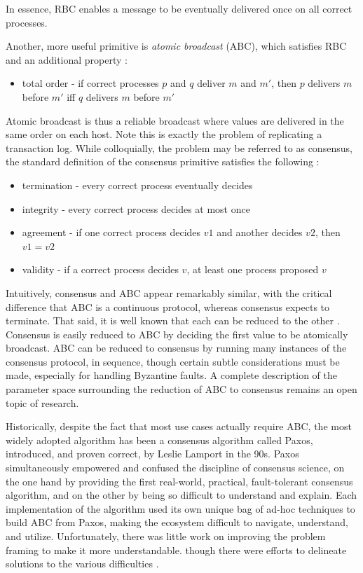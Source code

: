 In essence, RBC enables a message to be eventually delivered once on all correct processes.

Another, more useful primitive is \emph{atomic broadcast} (ABC), 
which satisfies RBC and an additional property \cite{chandra1996unreliable}:

\begin{itemize}
\item total order - if correct processes $p$ and $q$ deliver $m$ and $m'$, then $p$ delivers $m$ before $m'$ iff $q$ delivers $m$ before $m'$
\end{itemize}

Atomic broadcast is thus a reliable broadcast where values are delivered in the same order on each host. 
Note this is exactly the problem of replicating a transaction log.
While colloquially, the problem may be referred to as consensus, 
the standard definition of the consensus primitive satisfies the following \cite{chandra1996unreliable}:
\begin{itemize}
\item termination - every correct process eventually decides
\item integrity - every correct process decides at most once
\item agreement - if one correct process decides $v1$ and another decides $v2$, then $v1=v2$
\item validity - if a correct process decides $v$, at least one process proposed $v$
\end{itemize}

Intuitively, consensus and ABC appear remarkably similar, 
with the critical difference that ABC is a continuous protocol,
whereas consensus expects to terminate.
That said, it is well known that each can be reduced to the other \cite{chandra1996unreliable}.
Consensus is easily reduced to ABC by deciding the first value to be atomically broadcast.
ABC can be reduced to consensus by running many instances of the consensus protocol, 
in sequence, 
though certain subtle considerations must be made, 
especially for handling Byzantine faults.
A complete description of the parameter space surrounding
the reduction of ABC to consensus remains an open topic of research.

Historically, despite the fact that most use cases actually require ABC,
the most widely adopted algorithm has been a consensus algorithm called Paxos, 
introduced, and proven correct, by Leslie Lamport in the 90s.
Paxos simultaneously empowered and confused the discipline of consensus science,
on the one hand by providing the first real-world, practical, fault-tolerant consensus algorithm,
and on the other by being so difficult to understand and explain.
Each implementation of the algorithm used its own unique bag of ad-hoc techniques
to build ABC from Paxos, making the ecosystem difficult to navigate, understand, and utilize.
Unfortunately, there was little work on improving the problem framing to make it more understandable.
though there were efforts to delineate solutions to the various difficulties \cite{chandra2007paxos}.

